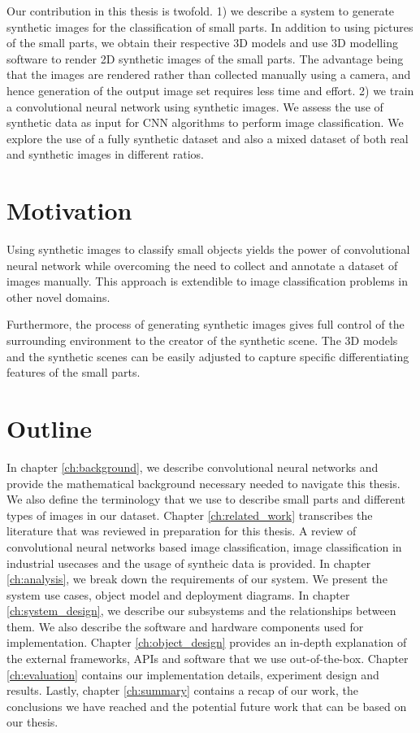 Our contribution in this thesis is twofold. 1) we describe a system to generate synthetic images for the classification of small parts. In addition to using pictures of the small parts, we obtain their respective 3D models and use 3D modelling software to render 2D synthetic images of the small parts. The advantage being that the images are rendered rather than collected manually using a camera, and hence generation of the output image set requires less time and effort. 2) we train a convolutional neural network using synthetic images. We assess the use of synthetic data as input for CNN algorithms to perform image classification. We explore the use of a fully synthetic dataset and also a mixed dataset of both real and synthetic images in different ratios.

\section{Motivation}

Using synthetic images to classify small objects yields the power of convolutional neural network while overcoming the need to collect and annotate a dataset of images manually. This approach is extendible to image classification problems in other novel domains.

Furthermore, the process of generating synthetic images gives full control of the surrounding environment to the creator of the synthetic scene. The 3D models and the synthetic scenes can be easily adjusted to capture specific differentiating features of the small parts.

\section{Outline}
In chapter \ref{ch:background}, we describe convolutional neural networks and provide the mathematical background necessary needed to navigate this thesis. We also define the terminology that we use to describe small parts and different types of images in our dataset. Chapter \ref{ch:related_work} transcribes the literature that was reviewed in preparation for this thesis. A review of convolutional neural networks based image classification, image classification in industrial usecases and the usage of syntheic data is provided. In chapter \ref{ch:analysis}, we break down the requirements of our system. We present the system use cases, object model and deployment diagrams. In chapter \ref{ch:system_design}, we describe our subsystems and the relationships between them. We also describe the software and hardware components used for implementation. Chapter \ref{ch:object_design} provides an in-depth explanation of the external frameworks, APIs and software that we use out-of-the-box. Chapter \ref{ch:evaluation} contains our implementation details, experiment design and results. Lastly, chapter \ref{ch:summary} contains a recap of our work, the conclusions we have reached and the potential future work that can be based on our thesis.
